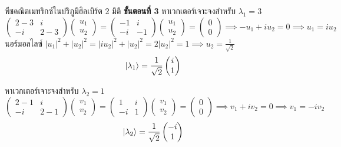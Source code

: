 \begin{psctbox}{พีชคณิตเมทริกซ์ในปริภูมิฮิลเบิร์ต 2 มิติ}
\textbf{ขั้นตอนที่ 3} หาเวกเตอร์เจาะจงสำหรับ $\lambda_1 = 3$
\begin{equation*}
\begin{pmatrix} 2-3 & i \\ -i & 2-3 \end{pmatrix} \begin{pmatrix} u_1 \\ u_2 \end{pmatrix} = \begin{pmatrix} -1 & i \\ -i & -1 \end{pmatrix} \begin{pmatrix} u_1 \\ u_2 \end{pmatrix} = \begin{pmatrix} 0 \\ 0 \end{pmatrix} \implies -u_1 + i u_2 = 0 \implies u_1 = i u_2
\end{equation*}
นอร์มอลไลซ์ $|u_1|^2 + |u_2|^2 = |i u_2|^2 + |u_2|^2 = 2|u_2|^2 = 1 \implies u_2 = \frac{1}{\sqrt{2}}$
\begin{equation*}
\ket{\lambda_1} = \frac{1}{\sqrt{2}}\begin{pmatrix} i \\ 1 \end{pmatrix}
\end{equation*}

หาเวกเตอร์เจาะจงสำหรับ $\lambda_2 = 1$
\begin{equation*}
\begin{pmatrix} 2-1 & i \\ -i & 2-1 \end{pmatrix} \begin{pmatrix} v_1 \\ v_2 \end{pmatrix} = \begin{pmatrix} 1 & i \\ -i & 1 \end{pmatrix} \begin{pmatrix} v_1 \\ v_2 \end{pmatrix} = \begin{pmatrix} 0 \\ 0 \end{pmatrix} \implies v_1 + i v_2 = 0 \implies v_1 = -i v_2
\end{equation*}
\begin{equation*}
\ket{\lambda_2} = \frac{1}{\sqrt{2}}\begin{pmatrix} -i \\ 1 \end{pmatrix}
\end{equation*}


\end{psctbox}

